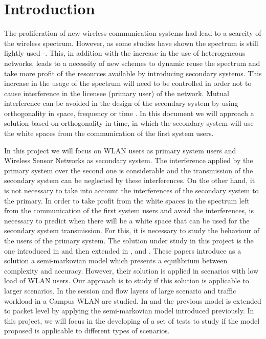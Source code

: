 \chapter{Introduction} \label{sec:introduction}

The proliferation of new wireless communication systems had lead to a scarcity of the wireless spectrum. However, as some studies have shown the spectrum is still lightly used \cite{gts1}-\cite{gts3}. This, in addition with the increase in the use of heterogeneous networks, leads to a necessity of new schemes to dynamic reuse the spectrum and take more profit of the resources available by introducing secondary systems. This increase in the usage of the spectrum will need to be controlled in order not to cause interference in the licensee (primary user) of the network. Mutual interference can be avoided in the design of the secondary system by using orthogonality in space, frequency or time \cite{gts3}. In this document we will approach a solution based on orthogonality in time, in which the secondary system will use the white spaces from the communication of the first system users.

In this project we will focus on \acs{WLAN} users as primary system users and Wireless Sensor Networks as secondary system. The interference applied by the primary system over the second one is considerable and the transmission of the secondary system can be neglected by these interferences. On the other hand, it is not necessary to take into account the interferences of the secondary system to the primary. In order to take profit from the white spaces in the spectrum left from the communication of the first system users and avoid the interferences, is necessary to predict when there will be a white space that can be used for the secondary system transmission. For this, it is necessary to study the behaviour of the users of the primary system. The solution under study in this project is the one introduced in \cite{gts1} and then extended in \cite{gts2}, \cite{gts3} and \cite{gts4}. These papers introduce as a solution a semi-markovian model which presents a equilibrium between complexity and accuracy. However, their solution is applied in scenarios with low load of WLAN users. Our approach is to study if this solution is applicable to larger scenarios. In \cite{hkps1} the session and flow layers of large scenario and traffic workload in a Campus WLAN are studied. In \cite{gfpp1} and \cite{lgfp1} the previous model is extended to packet level by applying the semi-markovian model introduced previously. In this project, we will focus in the developing of a set of tests to study if the model proposed is applicable to different types of scenarios.

